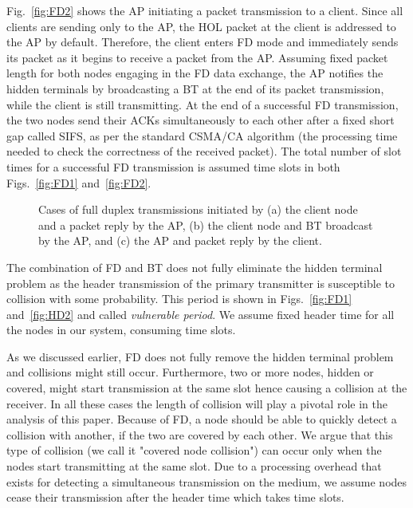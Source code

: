 \documentclass[10pt,journal,cspaper,compsoc]{IEEEtran}
\begin{document}
Fig.~\ref{fig:FD2} shows the AP initiating a packet transmission to a client. Since all clients are sending only to the AP, the HOL packet at the client is addressed to the AP by default. Therefore, the client enters FD mode and immediately sends its packet as it begins to receive a packet from the AP. Assuming fixed packet length for both nodes engaging in the FD data exchange, the AP notifies the hidden terminals by broadcasting a BT at the end of its packet transmission, while the client is still transmitting. At the end of a successful FD transmission, the two nodes send their ACKs simultaneously to each other after a fixed short gap called SIFS, as per the standard CSMA/CA algorithm (the processing time needed to check the correctness of the received packet). The total number of slot times for a successful FD transmission is assumed  time slots in both Figs.~\ref{fig:FD1} and~\ref{fig:FD2}.
\begin{figure}
\centering
{} 
\caption{Cases of full duplex transmissions initiated by (a) the client node and a packet reply by the AP, (b) the client node and BT broadcast by the AP, and (c) the AP and packet reply by the client.}
\label{fig:FD}
\end{figure}

The combination of FD and BT does not fully eliminate the hidden terminal problem as the header transmission of the primary transmitter is susceptible to collision with some probability. This period is shown in Figs.~\ref{fig:FD1} and~\ref{fig:HD2} and called \textit{vulnerable period}. We assume fixed header time for all the nodes in our system, consuming  time slots.

As we discussed earlier, FD does not fully remove the hidden terminal problem and collisions might still occur. Furthermore, two or more nodes, hidden or covered, might start transmission at the same slot hence causing a collision at the receiver. In all these cases the length of collision will play a pivotal role in the analysis of this paper. Because of FD, a node should be able to quickly detect a collision with another, if the two are covered by each other. We argue that this type of collision (we call it "covered node collision") can occur only when the nodes start transmitting at the same slot. Due to a processing overhead that exists for detecting a simultaneous transmission on the medium, we assume nodes cease their transmission after the header time which takes  time slots. 
\end{document}
